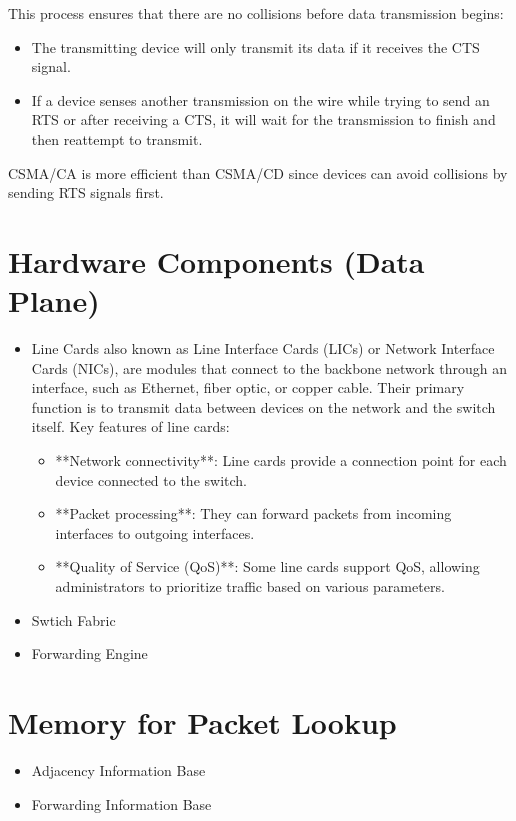 \documentclass{article}
\begin{document}
This process ensures that there are no collisions before data transmission begins:
	\begin{itemize}
		\item The transmitting device will only transmit its data if it receives the CTS signal.
		\item If a device senses another transmission on the wire while trying to send an RTS or after receiving a CTS, it will wait for the transmission to finish and then reattempt to transmit.
	\end{itemize}
CSMA/CA is more efficient than CSMA/CD since devices can avoid collisions by sending RTS signals first.

\section*{Hardware Components (Data Plane)}
	\begin{itemize}
		\item Line Cards also known as Line Interface Cards (LICs) or Network Interface Cards (NICs), are modules that connect to the backbone network through an interface, such as Ethernet, fiber optic, or copper cable. Their primary function is to transmit data between devices on the network and the switch itself.
			Key features of line cards:
				\begin{itemize}
					\item **Network connectivity**: Line cards provide a connection point for each device connected to the switch.
					\item **Packet processing**: They can forward packets from incoming interfaces to outgoing interfaces.
					\item **Quality of Service (QoS)**: Some line cards support QoS, allowing administrators to prioritize traffic based on various parameters.
				\end{itemize}





		\item Swtich Fabric
		\item Forwarding Engine
	\end{itemize}

\section*{Memory for Packet Lookup}
	\begin{itemize}
		\item Adjacency Information Base
		\item Forwarding Information Base
	\end{itemize}
\end{document}
